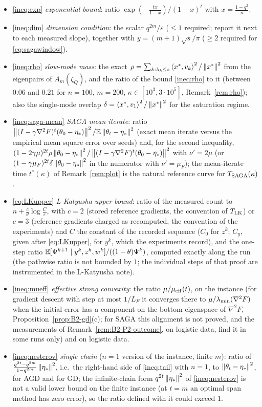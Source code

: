 \begin{itemize}[nosep]
\item \eqref{ineq:exp} \emph{exponential bound}: ratio $\exp(-\frac{tx}{1-x})/(1-x)^t$ with $x=\frac{1-q^2}n$.
\item \eqref{ineq:dim} \emph{dimension condition}: the scalar $q^{2m}/\varepsilon$ ($\le1$ required; report it next to each measured slope), together with $y=(m+1)\sqrt s/\pi$ ($\ge2$ required for \eqref{eq:sagawindow}).
\item \eqref{ineq:rho} \emph{slow-mode mass}: the exact $\rho=\sum_{k:\lambda_k\le s}\left\langle x^\ast, v_k \right\rangle^2/\left\|x^\ast\right\|^2$ from the eigenpairs of $A_m(\zeta_Q)$, and the ratio of the bound \eqref{ineq:rho} to it (between $0.06$ and $0.21$ for $n=100$, $m=200$, $\kappa\in[10^3,3\cdot10^5]$, Remark~\ref{rem:rho}); also the single-mode overlap $\delta=\left\langle x^\ast, v_1 \right\rangle^2/\left\|x^\ast\right\|^2$ for the saturation regime.
\item \eqref{ineq:saga-mean} \emph{SAGA mean iterate}: ratio $\left\|(I-\gamma\nabla^2F)^t(\theta_0-\eta_\ast)\right\|^2/\mathbb{E}\left\|\theta_t-\eta_\ast\right\|^2$ (exact mean iterate versus the empirical mean square error over seeds) and, for the second inequality, $(1-2\gamma\mu)^{2t}\rho\left\|\theta_0-\eta_\ast\right\|^2/\left\|(I-\gamma\nabla^2F)^t(\theta_0-\eta_\ast)\right\|^2$ with $\nu'=2\mu$ (or $(1-\gamma\mu_F)^{2t}\delta\left\|\theta_0-\eta_\ast\right\|^2$ in the numerator with $\nu'=\mu_F$); the mean-iterate time $t^\ast(\kappa)$ of Remark~\ref{rem:plot} is the natural reference curve for $T_{\rm SAGA}(\kappa)$.
\item \eqref{eq:LKupper} \emph{L-Katyusha upper bound}: ratio of the measured count to $n+\frac c\theta\log\frac C\varepsilon$, with $c=2$ (stored reference gradients, the convention of $T_{\rm LK}$) or $c=3$ (reference gradients charged as recomputed, the convention of the experiments) and $C$ the constant of the recorded sequence ($C_0$ for $z^k$; $C_y$, given after \eqref{eq:LKupper}, for $y^k$, which the experiments record), and the one-step ratio $\mathbb{E}[\Psi^{k+1}\mid y^k,z^k,w^k]/((1-\theta)\Psi^k)$, computed exactly along the run (the pathwise ratio is not bounded by $1$; the individual steps of that proof are instrumented in the L-Katyusha note).
\item \eqref{ineq:mueff} \emph{effective strong convexity}: the ratio $\mu/\mu_{\mathrm{eff}}(t)$, on the instance (for gradient descent with step at most $1/L_F$ it converges there to $\mu/\lambda_{\min}(\nabla^2F)$ when the initial error has a component on the bottom eigenspace of $\nabla^2F$, Proposition~\ref{prop:B2-gd}(c); for SAGA this alignment is not proved, and the measurements of Remark~\ref{rem:B2-P2-outcome}, on logistic data, find it in some runs only) and on logistic data.
\item \eqref{ineq:nesterov} \emph{single chain} ($n=1$ version of the instance, finite $m$): ratio of $\frac{q^{2t}-q^{2m}}{1-q^{2m}}\left\|\eta_\ast\right\|^2$, i.e.\ the right-hand side of \eqref{ineq:tail} with $n=1$, to $\left\|\theta_t-\eta_\ast\right\|^2$, for AGD and for GD; the infinite-chain form $q^{2t}\left\|\eta_\ast\right\|^2$ of \eqref{ineq:nesterov} is not a valid lower bound on the finite instance (at $t=m$ an optimal span method has zero error), so the ratio defined with it could exceed $1$.
\end{itemize}

